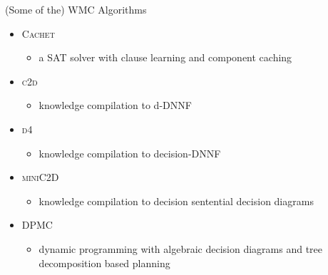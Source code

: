 \documentclass{beamer}
\begin{document}
\begin{frame}{(Some of the) WMC Algorithms}
  \begin{itemize}
    \item \textsc{Cachet} \textcolor{gray}{\parencite{DBLP:conf/sat/SangBBKP04}}
          \begin{itemize}
            \item a SAT solver with clause learning and component caching
          \end{itemize}
    \item \textsc{c2d} \textcolor{gray}{\parencite{DBLP:conf/ecai/Darwiche04}}
          \begin{itemize}
            \item knowledge compilation to d-DNNF
          \end{itemize}
    \item \textsc{d4} \textcolor{gray}{\parencite{DBLP:conf/ijcai/LagniezM17}}
          \begin{itemize}
            \item knowledge compilation to decision-DNNF
          \end{itemize}
    \item \textsc{miniC2D} \textcolor{gray}{\parencite{DBLP:conf/ijcai/OztokD15}}
          \begin{itemize}
            \item knowledge compilation to decision sentential decision diagrams
          \end{itemize}
    \item \textsc{DPMC} \textcolor{gray}{\parencite{DBLP:conf/cp/DudekPV20}}
          \begin{itemize}
            \item dynamic programming with algebraic decision diagrams and tree
                  decomposition based planning
          \end{itemize}
  \end{itemize}
\end{frame}
\end{document}
